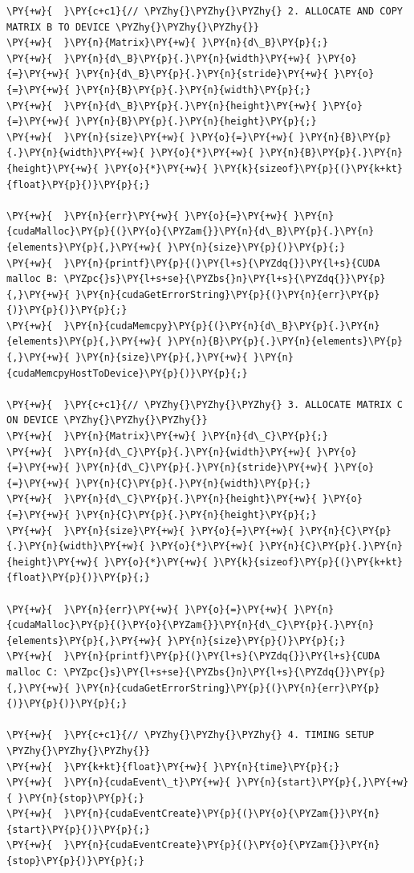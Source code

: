 \begin{Verbatim}[label=\makebox{\url{https://github.com/lucabaldini/cmepda/tree/master/slides/latex/snippets/MatrixMultiplication_shared.cu}},commandchars=\\\{\}]
\PY{+w}{  }\PY{c+c1}{// \PYZhy{}\PYZhy{}\PYZhy{} 2. ALLOCATE AND COPY MATRIX B TO DEVICE \PYZhy{}\PYZhy{}\PYZhy{}}
\PY{+w}{  }\PY{n}{Matrix}\PY{+w}{ }\PY{n}{d\_B}\PY{p}{;}
\PY{+w}{  }\PY{n}{d\_B}\PY{p}{.}\PY{n}{width}\PY{+w}{ }\PY{o}{=}\PY{+w}{ }\PY{n}{d\_B}\PY{p}{.}\PY{n}{stride}\PY{+w}{ }\PY{o}{=}\PY{+w}{ }\PY{n}{B}\PY{p}{.}\PY{n}{width}\PY{p}{;}
\PY{+w}{  }\PY{n}{d\_B}\PY{p}{.}\PY{n}{height}\PY{+w}{ }\PY{o}{=}\PY{+w}{ }\PY{n}{B}\PY{p}{.}\PY{n}{height}\PY{p}{;}
\PY{+w}{  }\PY{n}{size}\PY{+w}{ }\PY{o}{=}\PY{+w}{ }\PY{n}{B}\PY{p}{.}\PY{n}{width}\PY{+w}{ }\PY{o}{*}\PY{+w}{ }\PY{n}{B}\PY{p}{.}\PY{n}{height}\PY{+w}{ }\PY{o}{*}\PY{+w}{ }\PY{k}{sizeof}\PY{p}{(}\PY{k+kt}{float}\PY{p}{)}\PY{p}{;}

\PY{+w}{  }\PY{n}{err}\PY{+w}{ }\PY{o}{=}\PY{+w}{ }\PY{n}{cudaMalloc}\PY{p}{(}\PY{o}{\PYZam{}}\PY{n}{d\_B}\PY{p}{.}\PY{n}{elements}\PY{p}{,}\PY{+w}{ }\PY{n}{size}\PY{p}{)}\PY{p}{;}
\PY{+w}{  }\PY{n}{printf}\PY{p}{(}\PY{l+s}{\PYZdq{}}\PY{l+s}{CUDA malloc B: \PYZpc{}s}\PY{l+s+se}{\PYZbs{}n}\PY{l+s}{\PYZdq{}}\PY{p}{,}\PY{+w}{ }\PY{n}{cudaGetErrorString}\PY{p}{(}\PY{n}{err}\PY{p}{)}\PY{p}{)}\PY{p}{;}
\PY{+w}{  }\PY{n}{cudaMemcpy}\PY{p}{(}\PY{n}{d\_B}\PY{p}{.}\PY{n}{elements}\PY{p}{,}\PY{+w}{ }\PY{n}{B}\PY{p}{.}\PY{n}{elements}\PY{p}{,}\PY{+w}{ }\PY{n}{size}\PY{p}{,}\PY{+w}{ }\PY{n}{cudaMemcpyHostToDevice}\PY{p}{)}\PY{p}{;}

\PY{+w}{  }\PY{c+c1}{// \PYZhy{}\PYZhy{}\PYZhy{} 3. ALLOCATE MATRIX C ON DEVICE \PYZhy{}\PYZhy{}\PYZhy{}}
\PY{+w}{  }\PY{n}{Matrix}\PY{+w}{ }\PY{n}{d\_C}\PY{p}{;}
\PY{+w}{  }\PY{n}{d\_C}\PY{p}{.}\PY{n}{width}\PY{+w}{ }\PY{o}{=}\PY{+w}{ }\PY{n}{d\_C}\PY{p}{.}\PY{n}{stride}\PY{+w}{ }\PY{o}{=}\PY{+w}{ }\PY{n}{C}\PY{p}{.}\PY{n}{width}\PY{p}{;}
\PY{+w}{  }\PY{n}{d\_C}\PY{p}{.}\PY{n}{height}\PY{+w}{ }\PY{o}{=}\PY{+w}{ }\PY{n}{C}\PY{p}{.}\PY{n}{height}\PY{p}{;}
\PY{+w}{  }\PY{n}{size}\PY{+w}{ }\PY{o}{=}\PY{+w}{ }\PY{n}{C}\PY{p}{.}\PY{n}{width}\PY{+w}{ }\PY{o}{*}\PY{+w}{ }\PY{n}{C}\PY{p}{.}\PY{n}{height}\PY{+w}{ }\PY{o}{*}\PY{+w}{ }\PY{k}{sizeof}\PY{p}{(}\PY{k+kt}{float}\PY{p}{)}\PY{p}{;}

\PY{+w}{  }\PY{n}{err}\PY{+w}{ }\PY{o}{=}\PY{+w}{ }\PY{n}{cudaMalloc}\PY{p}{(}\PY{o}{\PYZam{}}\PY{n}{d\_C}\PY{p}{.}\PY{n}{elements}\PY{p}{,}\PY{+w}{ }\PY{n}{size}\PY{p}{)}\PY{p}{;}
\PY{+w}{  }\PY{n}{printf}\PY{p}{(}\PY{l+s}{\PYZdq{}}\PY{l+s}{CUDA malloc C: \PYZpc{}s}\PY{l+s+se}{\PYZbs{}n}\PY{l+s}{\PYZdq{}}\PY{p}{,}\PY{+w}{ }\PY{n}{cudaGetErrorString}\PY{p}{(}\PY{n}{err}\PY{p}{)}\PY{p}{)}\PY{p}{;}

\PY{+w}{  }\PY{c+c1}{// \PYZhy{}\PYZhy{}\PYZhy{} 4. TIMING SETUP \PYZhy{}\PYZhy{}\PYZhy{}}
\PY{+w}{  }\PY{k+kt}{float}\PY{+w}{ }\PY{n}{time}\PY{p}{;}
\PY{+w}{  }\PY{n}{cudaEvent\_t}\PY{+w}{ }\PY{n}{start}\PY{p}{,}\PY{+w}{ }\PY{n}{stop}\PY{p}{;}
\PY{+w}{  }\PY{n}{cudaEventCreate}\PY{p}{(}\PY{o}{\PYZam{}}\PY{n}{start}\PY{p}{)}\PY{p}{;}
\PY{+w}{  }\PY{n}{cudaEventCreate}\PY{p}{(}\PY{o}{\PYZam{}}\PY{n}{stop}\PY{p}{)}\PY{p}{;}


\end{Verbatim}
